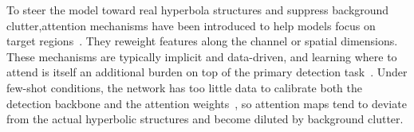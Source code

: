 \documentclass[lettersize,journal]{IEEEtran}
\begin{document}
To steer the model toward real hyperbola structures and suppress background
clutter,attention mechanisms have been introduced to help models focus on target
regions~\cite{hu2018senet,woo2018cbam,wang2020eca,hou2021coordinate,Fu2024A,hou2025endtoend}.
They reweight features along the channel or spatial dimensions. These mechanisms
are typically implicit and data-driven, and learning where to attend is itself
an additional burden on top of the primary detection
task~\cite{Hsiao2025ResNet-SE-CBAM}. Under few-shot conditions, the network has
too little data to calibrate both the detection backbone and the attention
weights~\cite{XIN2024102307}, so attention maps tend to deviate from the actual
hyperbolic structures and become diluted by background clutter. 
\end{document}
